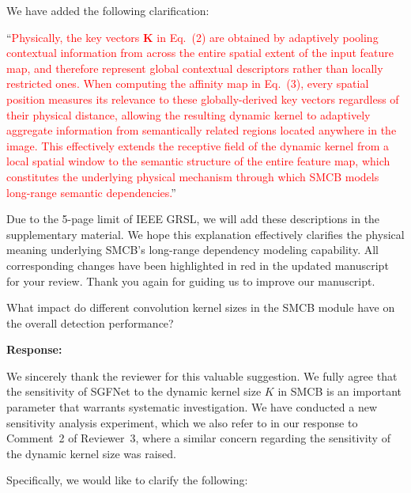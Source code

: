 We have added the following clarification:

``\textcolor{red}{Physically, the key vectors $\mathbf{K}$ in Eq.~(2) are obtained by adaptively pooling contextual information from across the entire spatial extent of the input feature map, and therefore represent global contextual descriptors rather than locally restricted ones. When computing the affinity map in Eq.~(3), every spatial position measures its relevance to these globally-derived key vectors regardless of their physical distance, allowing the resulting dynamic kernel to adaptively aggregate information from semantically related regions located anywhere in the image. This effectively extends the receptive field of the dynamic kernel from a local spatial window to the semantic structure of the entire feature map, which constitutes the underlying physical mechanism through which SMCB models long-range semantic dependencies.}''

Due to the 5-page limit of IEEE GRSL, we will add these descriptions in the supplementary material. We hope this explanation effectively clarifies the physical meaning underlying SMCB's long-range dependency modeling capability. All corresponding changes have been highlighted in red in the updated manuscript for your review. Thank you again for guiding us to improve our manuscript.

\vspace{2em}

\begin{tcolorbox}[title={Reviewer \#2, Comment \#4}] 
  \vspace{1em}
  
  \color{blue}
  What impact do different convolution kernel sizes in the SMCB module have on the overall detection performance?

  \vspace{1em}
\end{tcolorbox}

\textbf{Response:}

We sincerely thank the reviewer for this valuable suggestion. We fully agree that the sensitivity of SGFNet to the dynamic kernel size $K$ in SMCB is an important parameter that warrants systematic investigation. We have conducted a new sensitivity analysis experiment, which we also refer to in our response to Comment~2 of Reviewer~3, where a similar concern regarding the sensitivity of the dynamic kernel size was raised.

Specifically, we would like to clarify the following:

